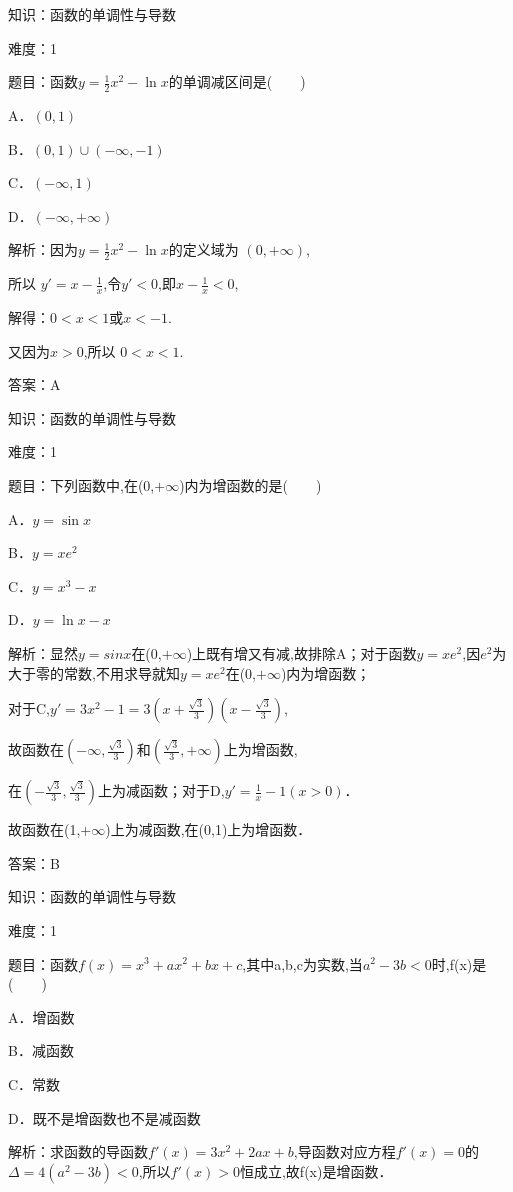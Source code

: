 \documentclass{article} %
\begin{document}
\noindent 

知识：函数的单调性与导数

难度：1

题目：函数$y=\frac{1}{2}x^{2}-\ln x$的单调减区间是(　　)

A．$(0,1) $  

B．$(0,1)\cup (-\infty,-1)$

C．$(-\infty,1)   $

D．$(-\infty,+\infty)$

解析：因为$y=\frac{1}{2}x^{2}-\ln x$的定义域为 $(0,+\infty)$,

所以 $y'=x-\frac{1}{x}$,令$y'<0$,即$x-\frac{1}{x}<0$,

解得：$0<x<1$或$x<-1$.

又因为$x>0$,所以 $0<x<1$.

答案：A



知识：函数的单调性与导数

难度：1

题目：下列函数中,在(0,$+\infty$)内为增函数的是(　　)

A．$y=\sin x   $

B．$y=xe^{2}$

C．$y=x^{3}-x  $ 

D．$y=\ln x-x$

解析：显然$y=sin x$在(0,$+\infty$)上既有增又有减,故排除A；对于函数$y=xe^{2}$,因$e^{2}$为大于零的常数,不用求导就知$y=xe^{2}$在(0,$+\infty$)内为增函数；

对于C,$y'=3x^{2}-1=3(x+\frac{\sqrt{3}}{3})(x-\frac{\sqrt{3}}{3})$,

故函数在$(-\infty,\frac{\sqrt{3}}{3})$和$(\frac{\sqrt{3}}{3},+\infty)$上为增函数,

在$(-\frac{\sqrt{3}}{3},\frac{\sqrt{3}}{3})$上为减函数；对于D,$y'=\frac{1}{x}-1(x>0)$．

故函数在(1,$+\infty$)上为减函数,在(0,1)上为增函数．

答案：B

知识：函数的单调性与导数

难度：1

题目：函数$f(x)=x^{3}+ax^{2}+bx+c$,其中a,b,c为实数,当$a^{2}-3b<0$时,f(x)是(　　)

A．增函数

B．减函数

C．常数

D．既不是增函数也不是减函数

解析：求函数的导函数$f'(x)=3x^{2}+2ax+b$,导函数对应方程$f'(x)=0$的$\Delta=4(a^{2}-3b)<0$,所以$f'(x)>0$恒成立,故f(x)是增函数．
\end{document}
